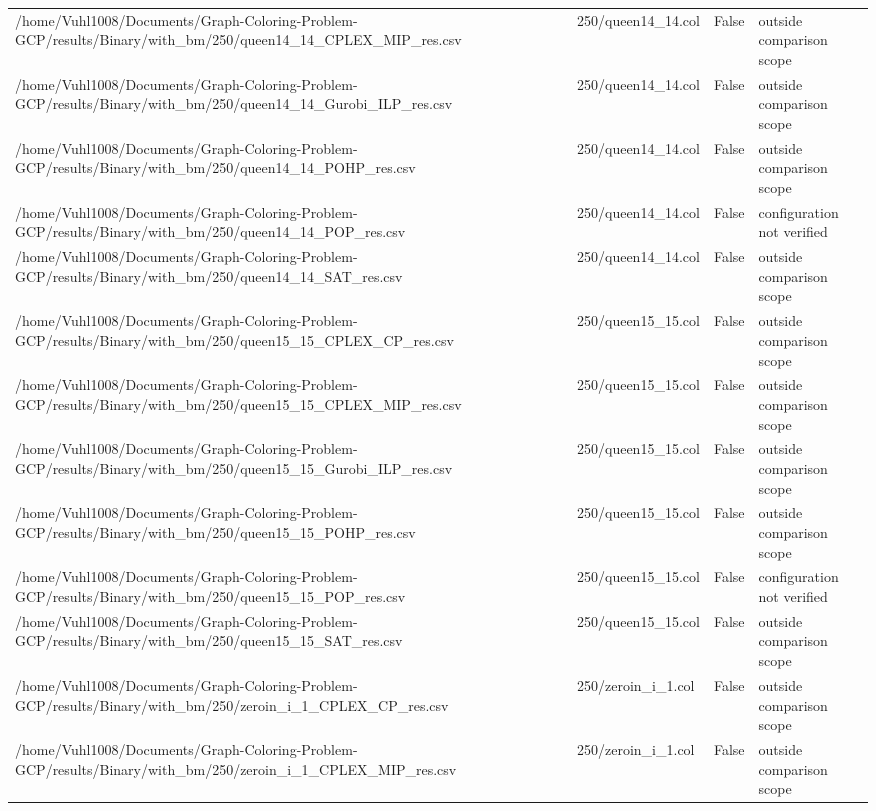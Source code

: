 \begin{table}[htbp]
\begin{tabular}{llll}
/home/Vuhl1008/Documents/Graph-Coloring-Problem-GCP/results/Binary/with\_bm/250/queen14\_14\_CPLEX\_MIP\_res.csv & 250/queen14\_14.col & False & outside comparison scope \\
/home/Vuhl1008/Documents/Graph-Coloring-Problem-GCP/results/Binary/with\_bm/250/queen14\_14\_Gurobi\_ILP\_res.csv & 250/queen14\_14.col & False & outside comparison scope \\
/home/Vuhl1008/Documents/Graph-Coloring-Problem-GCP/results/Binary/with\_bm/250/queen14\_14\_POHP\_res.csv & 250/queen14\_14.col & False & outside comparison scope \\
/home/Vuhl1008/Documents/Graph-Coloring-Problem-GCP/results/Binary/with\_bm/250/queen14\_14\_POP\_res.csv & 250/queen14\_14.col & False & configuration not verified \\
/home/Vuhl1008/Documents/Graph-Coloring-Problem-GCP/results/Binary/with\_bm/250/queen14\_14\_SAT\_res.csv & 250/queen14\_14.col & False & outside comparison scope \\
/home/Vuhl1008/Documents/Graph-Coloring-Problem-GCP/results/Binary/with\_bm/250/queen15\_15\_CPLEX\_CP\_res.csv & 250/queen15\_15.col & False & outside comparison scope \\
/home/Vuhl1008/Documents/Graph-Coloring-Problem-GCP/results/Binary/with\_bm/250/queen15\_15\_CPLEX\_MIP\_res.csv & 250/queen15\_15.col & False & outside comparison scope \\
/home/Vuhl1008/Documents/Graph-Coloring-Problem-GCP/results/Binary/with\_bm/250/queen15\_15\_Gurobi\_ILP\_res.csv & 250/queen15\_15.col & False & outside comparison scope \\
/home/Vuhl1008/Documents/Graph-Coloring-Problem-GCP/results/Binary/with\_bm/250/queen15\_15\_POHP\_res.csv & 250/queen15\_15.col & False & outside comparison scope \\
/home/Vuhl1008/Documents/Graph-Coloring-Problem-GCP/results/Binary/with\_bm/250/queen15\_15\_POP\_res.csv & 250/queen15\_15.col & False & configuration not verified \\
/home/Vuhl1008/Documents/Graph-Coloring-Problem-GCP/results/Binary/with\_bm/250/queen15\_15\_SAT\_res.csv & 250/queen15\_15.col & False & outside comparison scope \\
/home/Vuhl1008/Documents/Graph-Coloring-Problem-GCP/results/Binary/with\_bm/250/zeroin\_i\_1\_CPLEX\_CP\_res.csv & 250/zeroin\_i\_1.col & False & outside comparison scope \\
/home/Vuhl1008/Documents/Graph-Coloring-Problem-GCP/results/Binary/with\_bm/250/zeroin\_i\_1\_CPLEX\_MIP\_res.csv & 250/zeroin\_i\_1.col & False & outside comparison scope \\

\end{tabular}
\end{table}
